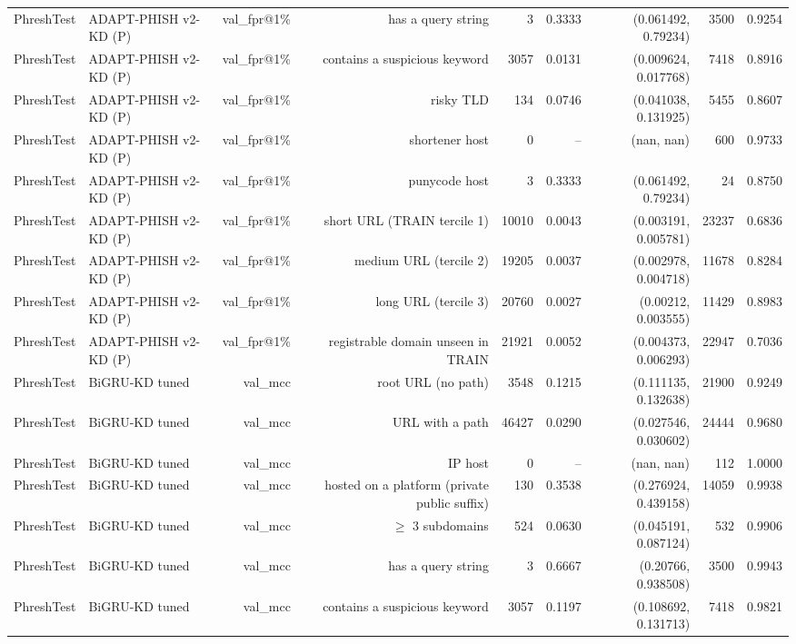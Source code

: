 \begin{table}[t]
\begin{tabular}{llrrrrrrr}
PhreshTest & ADAPT-PHISH v2-KD (P) & val\_fpr@1\% & has a query string & 3 & 0.3333 & (0.061492, 0.79234) & 3500 & 0.9254 \\
PhreshTest & ADAPT-PHISH v2-KD (P) & val\_fpr@1\% & contains a suspicious keyword & 3057 & 0.0131 & (0.009624, 0.017768) & 7418 & 0.8916 \\
PhreshTest & ADAPT-PHISH v2-KD (P) & val\_fpr@1\% & risky TLD & 134 & 0.0746 & (0.041038, 0.131925) & 5455 & 0.8607 \\
PhreshTest & ADAPT-PHISH v2-KD (P) & val\_fpr@1\% & shortener host & 0 & -- & (nan, nan) & 600 & 0.9733 \\
PhreshTest & ADAPT-PHISH v2-KD (P) & val\_fpr@1\% & punycode host & 3 & 0.3333 & (0.061492, 0.79234) & 24 & 0.8750 \\
PhreshTest & ADAPT-PHISH v2-KD (P) & val\_fpr@1\% & short URL (TRAIN tercile 1) & 10010 & 0.0043 & (0.003191, 0.005781) & 23237 & 0.6836 \\
PhreshTest & ADAPT-PHISH v2-KD (P) & val\_fpr@1\% & medium URL (tercile 2) & 19205 & 0.0037 & (0.002978, 0.004718) & 11678 & 0.8284 \\
PhreshTest & ADAPT-PHISH v2-KD (P) & val\_fpr@1\% & long URL (tercile 3) & 20760 & 0.0027 & (0.00212, 0.003555) & 11429 & 0.8983 \\
PhreshTest & ADAPT-PHISH v2-KD (P) & val\_fpr@1\% & registrable domain unseen in TRAIN & 21921 & 0.0052 & (0.004373, 0.006293) & 22947 & 0.7036 \\
PhreshTest & BiGRU-KD tuned & val\_mcc & root URL (no path) & 3548 & 0.1215 & (0.111135, 0.132638) & 21900 & 0.9249 \\
PhreshTest & BiGRU-KD tuned & val\_mcc & URL with a path & 46427 & 0.0290 & (0.027546, 0.030602) & 24444 & 0.9680 \\
PhreshTest & BiGRU-KD tuned & val\_mcc & IP host & 0 & -- & (nan, nan) & 112 & 1.0000 \\
PhreshTest & BiGRU-KD tuned & val\_mcc & hosted on a platform (private public suffix) & 130 & 0.3538 & (0.276924, 0.439158) & 14059 & 0.9938 \\
PhreshTest & BiGRU-KD tuned & val\_mcc & $\geq$ 3 subdomains & 524 & 0.0630 & (0.045191, 0.087124) & 532 & 0.9906 \\
PhreshTest & BiGRU-KD tuned & val\_mcc & has a query string & 3 & 0.6667 & (0.20766, 0.938508) & 3500 & 0.9943 \\
PhreshTest & BiGRU-KD tuned & val\_mcc & contains a suspicious keyword & 3057 & 0.1197 & (0.108692, 0.131713) & 7418 & 0.9821 \\

\end{tabular}
\end{table}
